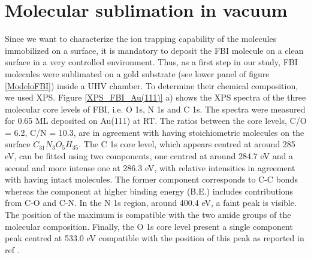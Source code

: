 \documentclass[aps,prl,reprint,longbibliography,superscriptaddress, english]{revtex4-1}
\begin{document}
\section{Molecular sublimation in vacuum}
Since we want to characterize the ion trapping capability of the molecules immobilized on a surface, it is mandatory to deposit the FBI molecule on a clean surface in a very controlled environment. Thus, as a first step in our study, FBI molecules were sublimated on a gold substrate (see lower panel of figure \ref{ModeloFBI}) inside a UHV chamber. To determine their chemical composition, we used XPS. Figure \ref{XPS_FBI_Au(111)} a) shows the XPS spectra of the three molecular core levels of FBI, i.e. O 1s, N 1s and C 1s. The spectra were measured for 0.65 ML deposited on Au(111) at RT. The ratios between the core levels, C/O = 6.2, C/N = 10.3, are in agreement with having stoichiometric molecules on the surface $ C_{31}N_{3}O_{5}H_{35}$. The C 1s core level, which appears centred at around 285 eV, can be fitted using two components, one centred at around 284.7 eV and a second and more intense one at 286.3 eV, with relative intensities in agreement with having intact molecules. The former component corresponds to C-C bonds whereas the component at higher binding energy (B.E.) includes contributions from C-O and C-N. In the N 1s region, around 400.4 eV, a faint peak is visible. The position of the maximum is compatible with the two amide groups of the molecular composition. Finally, the O 1s core level present a single component peak centred at 533.0 eV compatible with the position of this peak as reported in ref \cite{stredansky_-surface_2019}. 
\end{document}
